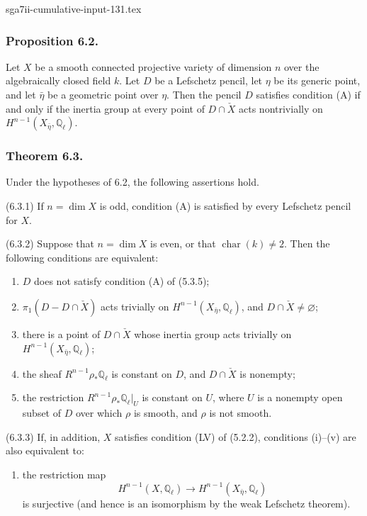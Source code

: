 \begin{filecontents*}{sga7ii-cumulative-input-131.tex}
\subsubsection*{Proposition 6.2.}
Let $X$ be a smooth connected projective variety of dimension $n$ over
the algebraically closed field $k$.  Let $D$ be a Lefschetz pencil, let
$\eta$ be its generic point, and let $\bar\eta$ be a geometric point
over $\eta$.  Then the pencil $D$ satisfies condition (A) if and only if
the inertia group at every point of $D\cap\check X$ acts nontrivially on
$H^{n-1}(X_{\bar\eta},\mathbb Q_\ell)$.

\subsubsection*{Theorem 6.3.}
Under the hypotheses of 6.2, the following assertions hold.

\medskip
\noindent
\textup{(6.3.1)} If $n=\dim X$ is odd, condition (A) is satisfied by
every Lefschetz pencil for $X$.

\medskip
\noindent
\textup{(6.3.2)} Suppose that $n=\dim X$ is even, or that
$\operatorname{char}(k)\ne2$.  Then the following conditions are
equivalent:
\begin{enumerate}
\item[(i)] $D$ does not satisfy condition (A) of (5.3.5);
\item[(ii)] $\pi_1(D-D\cap\check X)$ acts trivially on
  $H^{n-1}(X_{\bar\eta},\mathbb Q_\ell)$, and
  $D\cap\check X\ne\varnothing$;
\item[(iii)] there is a point of $D\cap\check X$ whose inertia group
  acts trivially on $H^{n-1}(X_{\bar\eta},\mathbb Q_\ell)$;
\item[(iv)] the sheaf $R^{n-1}\rho_*\mathbb Q_\ell$ is constant on
  $D$, and $D\cap\check X$ is nonempty;
\item[(v)] the restriction
  $R^{n-1}\rho_*\mathbb Q_\ell\vert_U$ is constant on $U$, where $U$
  is a nonempty open subset of $D$ over which $\rho$ is smooth, and
  $\rho$ is not smooth.
\end{enumerate}

\noindent
\textup{(6.3.3)} If, in addition, $X$ satisfies condition (LV) of
(5.2.2), conditions (i)--(v) are also equivalent to:
\begin{enumerate}
\item[(vi)] the restriction map
\[
H^{n-1}(X,\mathbb Q_\ell)
\longrightarrow H^{n-1}(X_{\bar\eta},\mathbb Q_\ell)
\]
is surjective (and hence is an isomorphism by the weak Lefschetz
theorem).
\end{enumerate}


\end{filecontents*}
